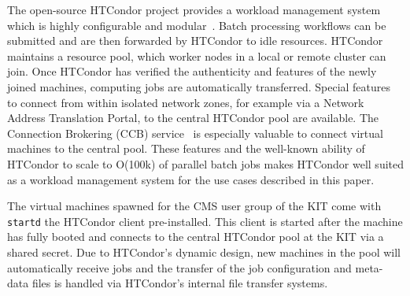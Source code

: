 The open-source HTCondor project provides a workload management system which is highly configurable and modular~\cite{HTCondor}. Batch processing workflows can be submitted and are then forwarded by HTCondor to idle resources. HTCondor maintains a resource pool, which worker nodes in a local or remote cluster can join. Once HTCondor has verified the authenticity and features of the newly joined machines, computing jobs are automatically transferred. Special features to connect from within isolated network zones, for example via a Network Address Translation Portal, to the central HTCondor pool are available. The Connection Brokering (CCB) service~\cite{HTCondorCCB} is especially valuable to connect virtual machines to the central pool. These features and the well-known ability of HTCondor to scale to O(100k) of parallel batch jobs makes HTCondor well suited as a workload management system for the use cases described in this paper.


The virtual machines spawned for the CMS user group of the KIT come with \texttt{startd} the HTCondor client pre-installed. This client is started after the machine has fully booted and connects to the central HTCondor pool at the KIT via a shared secret. Due to HTCondor's dynamic design, new machines in the pool will automatically receive jobs and the transfer of the job configuration and meta-data files is handled via HTCondor's internal file transfer systems.
